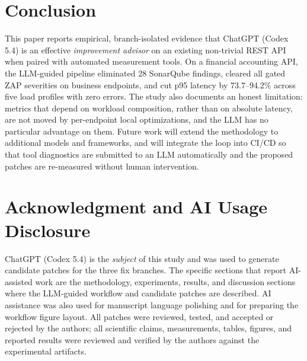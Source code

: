 \documentclass[conference,letterpaper]{IEEEtran}
\begin{document}
\section{Conclusion}
This paper reports empirical, branch-isolated evidence that ChatGPT (Codex 5.4) is an effective \emph{improvement advisor} on an existing non-trivial REST API when paired with automated measurement tools. On a financial accounting API, the LLM-guided pipeline eliminated 28 SonarQube findings, cleared all gated ZAP severities on business endpoints, and cut p95 latency by 73.7--94.2\% across five load profiles with zero errors. The study also documents an honest limitation: metrics that depend on workload composition, rather than on absolute latency, are not moved by per-endpoint local optimizations, and the LLM has no particular advantage on them. Future work will extend the methodology to additional models and frameworks, and will integrate the loop into CI/CD so that tool diagnostics are submitted to an LLM automatically and the proposed patches are re-measured without human intervention.

\section*{Acknowledgment and AI Usage Disclosure}
ChatGPT (Codex 5.4) is the \emph{subject} of this study and was used to generate candidate patches for the three fix branches. The specific sections that report AI-assisted work are the methodology, experiments, results, and discussion sections where the LLM-guided workflow and candidate patches are described. AI assistance was also used for manuscript language polishing and for preparing the workflow figure layout. All patches were reviewed, tested, and accepted or rejected by the authors; all scientific claims, measurements, tables, figures, and reported results were reviewed and verified by the authors against the experimental artifacts.
\end{document}
